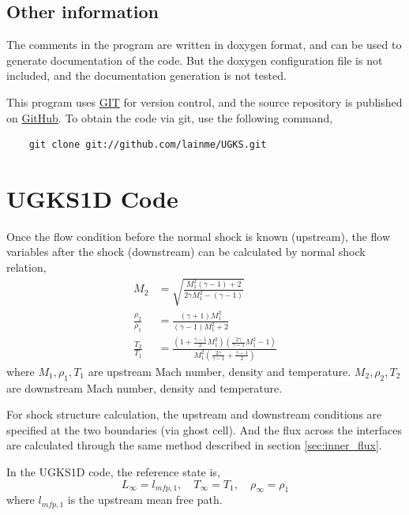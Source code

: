 \documentclass[a4paper]{book}
\begin{document}
\subsection{Other information}
The comments in the program are written in doxygen format, and can be used to generate documentation of the code. But the doxygen configuration file is not included, and the documentation generation is not tested.

This program uses \href{http://git-scm.com/}{GIT} for version control, and the source repository is published on \href{https://github.com/lainme/UGKS}{GitHub}. To obtain the code via git, use the following command,

\begin{verbatim}
    git clone git://github.com/lainme/UGKS.git
\end{verbatim}

\section{UGKS1D Code}
Once the flow condition before the normal shock is known (upstream), the flow variables after the shock (downstream) can be calculated by normal shock relation,
\begin{equation}
    \label{eq:normal_shock}
    \begin{aligned}
        M_2 &= \sqrt{\frac{M_1^2(\gamma-1)+2}{2\gamma M_1^2-(\gamma-1)}}\\
        \frac{\rho_2}{\rho_1} &= \frac{(\gamma+1)M_1^2}{(\gamma-1)M_1^2+2}\\
        \frac{T_2}{T_1} &= \frac{(1+\frac{\gamma-1}{2}M_1^2)(\frac{2\gamma}{\gamma-1}M_1^2-1)}{M_1^2(\frac{2\gamma}{\gamma-1}+\frac{\gamma-1}{2})}
    \end{aligned}
\end{equation}
where $M_1,\rho_1,T_1$ are upstream Mach number, density and temperature. $M_2,\rho_2,T_2$ are downstream Mach number, density and temperature.

For shock structure calculation, the upstream and downstream conditions are specified at the two boundaries (via ghost cell). And the flux across the interfaces are calculated through the same method described in section \ref{sec:inner_flux}.

In the UGKS1D code, the reference state is,
$$L_\infty=l_{mfp,1},\quad T_\infty=T_1,\quad \rho_\infty = \rho_1$$
where $l_{mfp,1}$ is the upstream mean free path.
\end{document}
